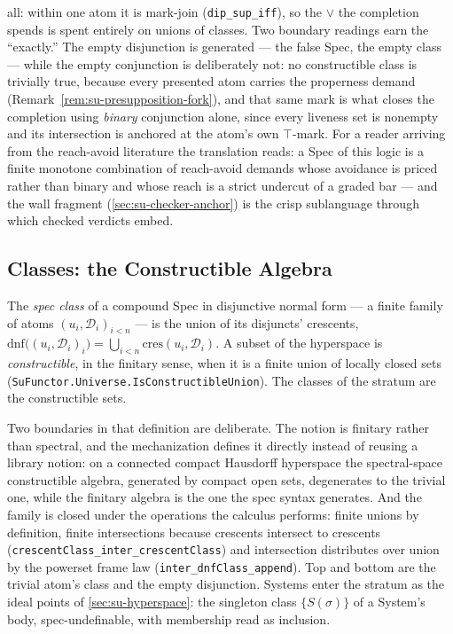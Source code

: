 all: within one atom it is mark-join (\texttt{dip\_sup\_iff}), so
the $\vee$ the completion spends is spent entirely on unions of
classes. Two boundary readings earn the ``exactly.'' The empty
disjunction is generated --- the false Spec, the empty class ---
while the empty conjunction is deliberately not: no constructible
class is trivially true, because every presented atom carries the
properness demand (Remark~\ref{rem:su-presupposition-fork}), and
that same mark is what closes the completion using \emph{binary}
conjunction alone, since every liveness set is nonempty and its
intersection is anchored at the atom's own $\top$-mark. For a
reader arriving from the reach-avoid literature the translation
reads: a Spec of this logic is a finite monotone combination of
reach-avoid demands whose avoidance is priced rather than binary
and whose reach is a strict undercut of a graded bar --- and the
wall fragment (\autoref{sec:su-checker-anchor}) is the crisp
sublanguage through which checked verdicts embed.

\subsection{Classes: the Constructible Algebra}

\begin{definition}
\label{def:su-constructible}
The \emph{spec class} of a compound Spec in disjunctive normal
form --- a finite family of atoms $(u_i, \mathcal{D}_i)_{i < n}$
--- is the union of its disjuncts' crescents,
$\mathrm{dnf}\bigl((u_i, \mathcal{D}_i)_i\bigr) = \bigcup_{i<n}
\mathrm{cres}(u_i, \mathcal{D}_i)$. A subset of the hyperspace is
\emph{constructible}, in the finitary sense, when it is a finite
union of locally closed sets
(\texttt{SuFunctor.Universe.IsConstructibleUnion}). The classes of
the stratum are the constructible sets.
\end{definition}

Two boundaries in that definition are deliberate. The notion is
finitary rather than spectral, and the mechanization defines it
directly instead of reusing a library notion: on a connected
compact Hausdorff hyperspace the spectral-space constructible
algebra, generated by compact open sets, degenerates to the
trivial one, while the finitary algebra is the one the spec syntax
generates. And the family is closed under the operations the
calculus performs: finite unions by definition, finite
intersections because crescents intersect to crescents
(\texttt{crescentClass\_inter\_crescentClass}) and intersection
distributes over union by the powerset frame law
(\texttt{inter\_dnfClass\_append}). Top and bottom are the trivial
atom's class and the empty disjunction. Systems enter the stratum
as the ideal points of \autoref{sec:su-hyperspace}: the singleton
class $\{S(\sigma)\}$ of a System's body, spec-undefinable, with
membership read as inclusion.

